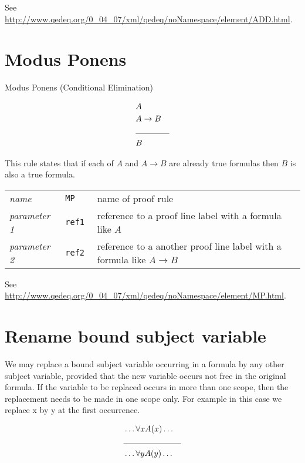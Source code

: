 \documentclass[a4paper,german,10pt,twoside]{book}
\theoremstyle{definition}
\theoremstyle{remark}
\begin{document}
\par
See \url{http://www.qedeq.org/0_04_07/xml/qedeq/noNamespace/element/ADD.html}.

\section{Modus Ponens} \label{chapter6_section2} \hypertarget{chapter6_section2}{}
Modus Ponens (Conditional Elimination)

\par
\begin{eqnarray*}
 & A & \\
 & A \rightarrow B& \\
 \cline{2-3}
 & B &
\end{eqnarray*}

This rule states that if each of $A$ and $A \rightarrow B$ are already true formulas then $B$ is also a true formula.

\par
\begin{tabularx}{\columnwidth}{lll}
  \emph{name}        & \tt{MP}   & name of proof rule \\
  \emph{parameter 1} & \tt{ref1} & reference to a proof line label with a formula like $A$\\
  \emph{parameter 2} & \tt{ref2} & reference to a another proof line label with a formula like $A \rightarrow B$ \\
\end{tabularx}

\par
See \url{http://www.qedeq.org/0_04_07/xml/qedeq/noNamespace/element/MP.html}.

\section{Rename bound subject variable} \label{chapter6_section3} \hypertarget{chapter6_section3}{}
We may replace a bound subject variable occurring in a formula by any other subject variable, provided that the new variable occurs not free in the original formula. If the variable to be replaced occurs in more than one scope, then the replacement needs to be made in one scope only.
For example in this case we replace x by y at the first occurrence.

\par
\begin{eqnarray*}
 & \ldots \forall x A(x) \ldots & \\
 \cline{2-3}
 & \ldots \forall y A(y) \ldots & \\
\end{eqnarray*}
\end{document}
